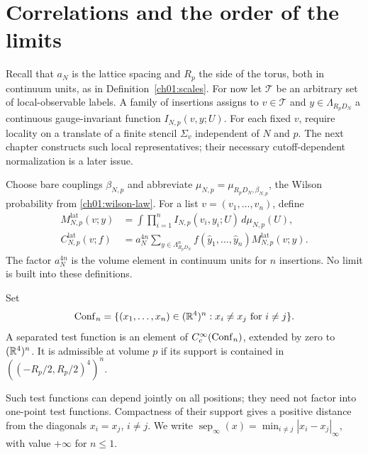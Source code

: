 \section{Correlations and the order of the limits}
\label{ch01:limits}

Recall that $a_N$ is the lattice spacing and $R_p$ the side of the
torus, both in continuum units, as in Definition~\ref{ch01:scales}. For now let $\mathcal T$ be an
arbitrary set of local-observable labels. A family of insertions assigns to
$v\in\mathcal T$ and $y\in\Lambda_{R_pD_N}$ a continuous gauge-invariant
function $I_{N,p}(v,y;U)$. For each fixed $v$, require locality on a translate
of a finite stencil $\Sigma_v$ independent of $N$ and $p$.
The next chapter constructs such local representatives; their necessary
cutoff-dependent normalization is a later issue.

Choose bare couplings $\beta_{N,p}$ and abbreviate
$\mu_{N,p}=\mu_{R_pD_N,\beta_{N,p}}$, the Wilson probability from
\eqref{ch01:wilson-law}. For a list $v=(v_1,\ldots,v_n)$, define
\begin{align}
 M^{\mathrm{lat}}_{N,p}(v;y)
   &=\int\prod_{i=1}^n I_{N,p}(v_i,y_i;U)\,d\mu_{N,p}(U),\\
 C^{\mathrm{lat}}_{N,p}(v;f)
   &=a_N^{4n}\sum_{y\in\Lambda_{R_pD_N}^n}
                   f(\widehat y_1,\ldots,\widehat y_n)
                   M^{\mathrm{lat}}_{N,p}(v;y).
 \label{ch01:lattice-smear}
\end{align}
The factor $a_N^{4n}$ is the volume element in continuum units for $n$ insertions.
No limit is built into these definitions.

\begin{definition}
\label{ch01:separated-test}
Set
\[
 \operatorname{Conf}_n=\{(x_1,\ldots,x_n)\in(\mathbb R^4)^n:x_i\ne x_j\text{ for }i\ne j\}.
\]
A separated test function is an element of $C_c^\infty(\operatorname{Conf}_n)$, extended by zero
to $(\mathbb R^4)^n$. It is admissible at volume $p$ if its support is contained
in $((-R_p/2,R_p/2)^4)^n$.
\end{definition}
Such test functions can depend jointly on all positions; they need not factor into
one-point test functions. Compactness of their support gives a positive distance
from the diagonals $x_i=x_j$, $i\ne j$. We write
$\operatorname{sep}_\infty(x)=\min_{i\ne j}|x_i-x_j|_\infty$, with value
$+\infty$ for $n\le1$.

